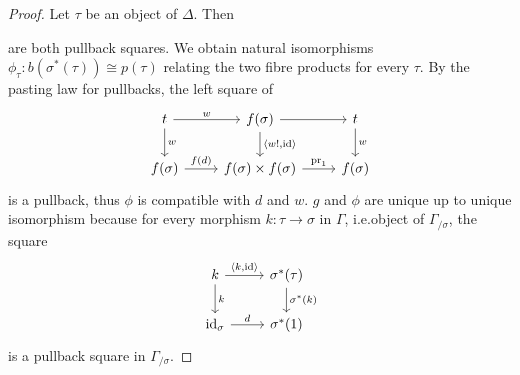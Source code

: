 \documentclass{article}
\theoremstyle{remark}
\theoremstyle{definition}
\begin{document}
\begin{proof}
  Let $\tau$ be an object of $\Delta$.
  Then
  are both pullback squares.
  We obtain natural isomorphisms $\phi_\tau : b(\sigma^*(\tau)) \cong p(\tau)$ relating the two fibre products for every $\tau$.
  By the pasting law for pullbacks, the left square of
  \begin{equation}
    \begin{tikzcd}
      t \arrow[r, "w"] \arrow[d, "w"] & f(\sigma) \arrow[d, "{\langle w!, \mathrm{id}\rangle}"] \arrow[r] & t \arrow[d, "w"] \\
      f(\sigma) \arrow[r, "f(d)"] & f(\sigma) \times f(\sigma) \arrow[r, "\mathrm{pr}_1"] & f(\sigma)
    \end{tikzcd}
  \end{equation}
  is a pullback, thus $\phi$ is compatible with $d$ and $w$.
  $g$ and $\phi$ are unique up to unique isomorphism because for every morphism $k : \tau \rightarrow \sigma$ in $\Gamma$, i.e.\@ object of $\Gamma_{/ \sigma}$, the square
  \begin{equation}
    \begin{tikzcd}
      k \arrow[r, "{\langle k, \mathrm{id} \rangle}"] \arrow[d, "k"] & \sigma^*(\tau) \arrow[d, "\sigma^*(k)"] \\
      \mathrm{id}_\sigma \arrow[r, "d"] & \sigma^*(1)
    \end{tikzcd}
  \end{equation}
  is a pullback square in $\Gamma_{/ \sigma}$.
\end{proof}
\end{document}

